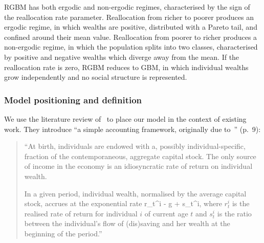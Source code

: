RGBM has both ergodic and non-ergodic regimes, characterised by the sign of the reallocation rate parameter. Reallocation from richer to poorer produces an ergodic regime, in which wealths are positive, distributed with a Pareto tail, and confined around their mean value. Reallocation from poorer to richer produces a non-ergodic regime, in which the population splits into two classes, characterised by positive and negative wealths which diverge away from the mean. If the reallocation rate is zero, RGBM reduces to GBM, in which individual wealths grow independently and no social structure is represented.

\subsubsection{Model positioning and definition}

We use the literature review of~\cite{de2015piketty} to place our model in the context of existing work. They introduce ``a simple accounting framework, originally due to~\cite{meade1964efficiency}'' (p.~9):

\begin{quote}
``At birth, individuals are endowed with a, possibly individual-specific, fraction of the contemporaneous, aggregate capital stock. The only source of income in the economy is an idiosyncratic rate of return on individual wealth.

In a given period, individual wealth, normalised by the average capital stock, accrues at the exponential rate 
\be
r_t^i - g + s_t^i,
\ee
where $r_t^i$ is the realised rate of return for individual $i$ of current age $t$ and $s^i_t$ is the ratio between the individual's flow of (dis)saving
and her wealth at the beginning of the period.''
\end{quote}

